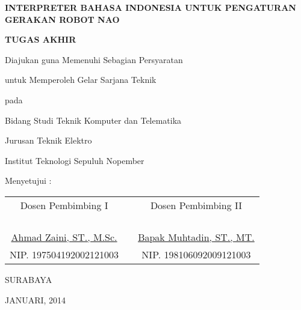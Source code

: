 \begin{center}
\textbf{INTERPRETER BAHASA INDONESIA UNTUK PENGATURAN GERAKAN ROBOT NAO}

\vspace{10ex}

\textbf{TUGAS AKHIR}

\vspace{7ex}

Diajukan guna Memenuhi Sebagian Persyaratan 

untuk Memperoleh Gelar Sarjana Teknik 

pada 

Bidang Studi Teknik Komputer dan Telematika 

Jurusan Teknik Elektro 

Institut Teknologi Sepuluh Nopember 

\vspace{5ex}

Menyetujui :

\vspace{5ex}

\begin{tabular}{c c c}
Dosen Pembimbing I&\hspace{1ex}&Dosen Pembimbing II
\\
\\
\\
\\
\\
\underline{Ahmad Zaini, ST., M.Sc.}&\hspace{1ex}&\underline{Bapak Muhtadin, ST., MT.}
\\
NIP. 197504192002121003&\hspace{1ex}&NIP. 198106092009121003
\end{tabular}

\vspace{23ex}

SURABAYA

JANUARI, 2014

\end{center}